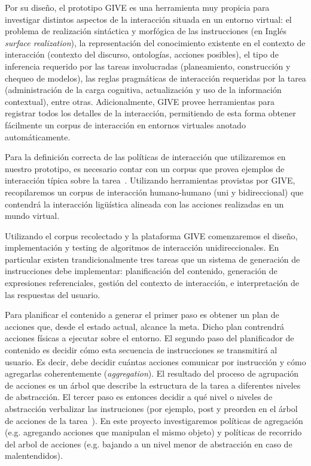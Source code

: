 Por su dise\~no, el prototipo GIVE es una herramienta muy propicia para
investigar distintos aspectos de la interacci\'on situada en un entorno 
virtual: el problema de realizaci\'on sint\'actica y morf\'ogica de las
instrucciones (en Ingl\'es \emph{surface realization}),
la representaci\'on del conocimiento existente en el contexto de
interacci\'on (contexto del discurso, ontolog\'ias, acciones posibles),
el tipo de inferencia requerido por las tareas involucradas
(planeamiento, construcci\'on y chequeo de modelos),
las reglas pragm\'aticas de interacci\'on requeridas por la tarea
(administraci\'on de la carga cognitiva, actualizaci\'on y uso de la
informaci\'on contextual), entre otras. Adicionalmente, GIVE provee 
herramientas para registrar todos los detalles de la
interacci\'on, permitiendo de esta forma obtener f\'acilmente un corpus de
interacci\'on en entornos virtuales anotado autom\'aticamente. 

Para la definici\'on correcta de las pol\'iticas de interacci\'on que
utilizaremos en nuestro prototipo, es necesario 
contar con un corpus que provea ejemplos de interacci\'on t\'ipica sobre la 
tarea~\citep{HCRC-93, byron-06}.  Utilizando herramientas provistas por GIVE, 
recopilaremos un corpus de interacci\'on humano-humano (uni y bidireccional)
que contendr\'a la interacci\'on lig\"u\'istica alineada con las acciones
realizadas en un mundo virtual. 

Utilizando el corpus recolectado y la plataforma GIVE comenzaremos el dise\~no,
implementaci\'on y testing de algoritmos de interacci\'on unidireccionales. En
particular existen trandicionalmente tres tareas que un sistema de generaci\'on
de instrucciones debe implementar: planificaci\'on del contenido, generaci\'on
de expresiones referenciales, gesti\'on del contexto de interacci\'on, e
interpretaci\'on de las respuestas del usuario. 

Para planificar el contenido a generar el primer paso es obtener un plan de
acciones que, desde el estado actual, alcance la meta. Dicho plan contrendr\'a
acciones f\'isicas a ejecutar sobre el entorno. El segundo paso del
planificador de contenido es decidir c\'omo esta secuencia de instrucciones se
transmitir\'a al usuario. Es decir, debe decidir cu\'antas acciones comunicar
por instrucci\'on y c\'omo agregarlas coherentemente (\emph{aggregation}). El
resultado del proceso de agrupaci\'on de acciones es un \'arbol que describe la
estructura de la tarea a diferentes niveles de abstracci\'on. El tercer paso
es entonces decidir a qu\'e nivel o niveles de abstracci\'on verbalizar las
instruciones (por ejemplo, post y preorden en el \'arbol de acciones de la
tarea~\citep{foster-etal-ijcai2009}). En este proyecto investigaremos
pol\'iticas de agregaci\'on (e.g. agregando acciones que manipulan el mismo
objeto) y pol\'iticas de recorrido del arbol de acciones (e.g. bajando a un
nivel menor de abstracci\'on en caso de malentendidos).  

